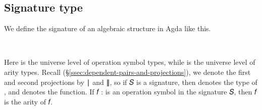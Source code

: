 \documentclass[a4paper,UKenglish,cleveref,autoref,thm-restate]{lipics-v2021}
\begin{document}
\subsection{Signature type}\label{signature-type}
We define the signature of an algebraic structure in Agda like this.
\ccpad
\begin{code}%
\>[0]\AgdaSpace{}%
\AgdaSymbol{:}\AgdaSpace{}%
\AgdaSymbol{(}\AgdaSpace{}%
\AgdaSpace{}%
\AgdaSymbol{:}\AgdaSpace{}%
\AgdaSymbol{)}\AgdaSpace{}%
\AgdaSpace{}%
\AgdaSymbol{(}\AgdaSpace{}%
\AgdaSpace{}%
\AgdaSymbol{)}\AgdaSpace{}%
\AgdaSpace{}%
\<%
\\
\>[0]\AgdaSpace{}%
\AgdaSpace{}%
\AgdaSpace{}%
\AgdaSymbol{=}\AgdaSpace{}%
\AgdaSpace{}%
\AgdaSpace{}%
\AgdaSpace{}%
\AgdaSpace{}%
\AgdaSpace{}%
\AgdaFunction{,}\AgdaSpace{}%
\AgdaSymbol{(}\AgdaSpace{}%
\AgdaSpace{}%
\AgdaSpace{}%
\AgdaSymbol{)}\<%
\end{code}
\ccpad
Here  is the universe level of operation symbol types, while  is the universe level of arity types. Recall (\S\ref{ssec:dependent-pairs-and-projections}), we denote the first and second projections by \ai ∣ and \ai ∥, so if \ab 𝑆 is a signature, then  denotes the type of , and  denotes the  function. If \ab 𝑓 \as :  is an operation symbol in the signature \ab 𝑆, then  \ab 𝑓 is the arity of \ab 𝑓.
\end{document}

